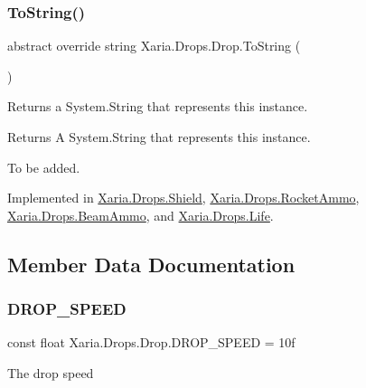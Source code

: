 \subsubsection{\texorpdfstring{To\+String()}{ToString()}}
{\footnotesize\ttfamily abstract override string Xaria.\+Drops.\+Drop.\+To\+String (\begin{DoxyParamCaption}{ }\end{DoxyParamCaption})\hspace{0.3cm}{\ttfamily [pure virtual]}}



Returns a System.\+String that represents this instance. 

\begin{DoxyReturn}{Returns}
A System.\+String that represents this instance. 
\end{DoxyReturn}


To be added. 

Implemented in \hyperlink{classXaria_1_1Drops_1_1Shield_ae6a57bede76de2462ce37a7de4bac987}{Xaria.\+Drops.\+Shield}, \hyperlink{classXaria_1_1Drops_1_1RocketAmmo_aafefb9dee3587e29c16eaa07b45228ad}{Xaria.\+Drops.\+Rocket\+Ammo}, \hyperlink{classXaria_1_1Drops_1_1BeamAmmo_ad368797dd8e08afff7189322eb29fefd}{Xaria.\+Drops.\+Beam\+Ammo}, and \hyperlink{classXaria_1_1Drops_1_1Life_aa75a0f73d72f18d4d9456c3f2a2ea0ce}{Xaria.\+Drops.\+Life}.



\subsection{Member Data Documentation}
\mbox{\label{classXaria_1_1Drops_1_1Drop_a9b124fd6ebca83cbfaeb6a591e8717db}} 
\subsubsection{\texorpdfstring{D\+R\+O\+P\+\_\+\+S\+P\+E\+ED}{DROP\_SPEED}}
{\footnotesize\ttfamily const float Xaria.\+Drops.\+Drop.\+D\+R\+O\+P\+\_\+\+S\+P\+E\+ED = 10f}



The drop speed 

\mbox{\label{classXaria_1_1Drops_1_1Drop_a51f2f721013d35bccfbbd1d85b65354e}} 
